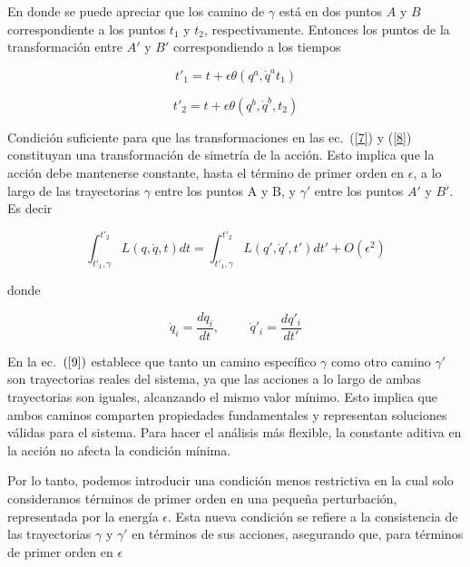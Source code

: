 \documentclass[a4paper,11pt]{article}
\begin{document}
En donde se puede apreciar que los camino de $\gamma$ está en dos puntos $A$ y $B$ correspondiente a los puntos  $t_1$ y $t_2$, respectivamente. 
Entonces los puntos de la transformación entre $A'$ y $B'$ correspondiendo a los tiempos\cite{Nilo}

\begin{equation}
     t'_1=t+\epsilon\theta(q^a,\dot{q}^at_1)
\label{7}
\end{equation}

\begin{equation}
    t'_2=t+\epsilon\theta(q^b,\dot{q}^b,t_2)
\label{8}
\end{equation}

Condición suficiente para que las transformaciones en las ec.~(\ref{7}) y (\ref{8}) constituyan una transformación de simetría de la acción. Esto implica que la acción debe mantenerse constante, hasta el término de primer orden en $\epsilon{}$, a lo largo de las trayectorias $\gamma$ entre los puntos A y B, y $\gamma'$ entre los puntos $A'$ y $B'$. Es decir

\begin{equation}
    \int_{t'_1,\gamma}^{t'_2} L(q,\dot{q},t)dt =  \int_{t'_1,\gamma}^{t'_2} L(q',\dot{q}',t')dt' + O(\epsilon^2)
    \label{9}
\end{equation}


donde


\begin{equation}
    \dot{q}_i = \frac{dq_i}{dt} , \hspace{1cm} \dot{q}'_i=\frac{dq'_i}{dt'}
\end{equation}


En la ec.~$(\ref{9})$  establece que tanto un camino específico $\gamma$ como otro camino $\gamma'$ son trayectorias reales del sistema, ya que las acciones a lo largo de ambas trayectorias son iguales, alcanzando el mismo valor mínimo. Esto implica que ambos caminos comparten propiedades fundamentales y representan soluciones válidas para el sistema. Para hacer el análisis más flexible, la constante aditiva en la acción no afecta la condición mínima. 

Por lo tanto, podemos introducir una condición menos restrictiva en la cual solo consideramos términos de primer orden en una pequeña perturbación, representada por la energía $\epsilon$. Esta nueva condición se refiere a la consistencia de las trayectorias $\gamma$ y $\gamma'$ en términos de sus acciones, asegurando que, para términos de primer orden en $\epsilon$
\end{document}
